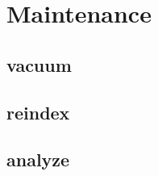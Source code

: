 \chapter{Maintenance}
\label{cha:MAINTENANCE}
\begin{comment}
When a new tuple's version is generated by an update it can be put everywhere, accordingly with the 
free space map so frequents updates can result in tuples moving across the data pages many and many 
times leaving a trail of dead tuples behind them. The dead tuples are physically allocated but 
invisible causing overhead and finally bloating the table. If there's any index built on 
the table, another consequence of the tuples moving across the data files is the index entries 
shall be updated. A B-tree index entry basically carries the indexed value with the pointer to the 
page containing the tuple. When the tupe change page the index entry shall be updated. This require 
an index scan to find the 
\end{comment}
\section{vacuum}
\section{reindex}
\section{analyze}


